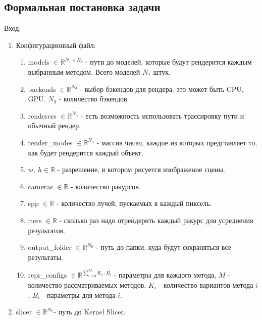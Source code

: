 \documentclass[a4paper,hidelinks,12pt]{article}
\begin{document}
\subsection{Формальная постановка задачи}

Вход:
\par
\begin{enumerate}
	\item Конфигурационный файл:
	\begin{enumerate}
		\item models $\in \mathbb{R}^{N_1 \times N_2}$ - пути до моделей, которые будут рендерится каждым выбранным методом. Всего моделей $N_1$ штук.
		\item backends $\in \mathbb{R}^{N_3}$ - выбор бэкендов для рендера, это может быть CPU, GPU. $N_3$ - количество бэкендов.
		\item renderers $\in \mathbb{R}^{N_4}$ - есть возможность использовать трассировку пути и обычный рендер.
		\item render\_modes $\in \mathbb{R}^{N_5}$ - массив чисел, каждое из которых представляет то, как будет рендерится каждый объект.
		\item $w, \ h \in \mathbb{R}$ - разрешение, в котором рисуется изображение сцены.
		\item cameras $\in \mathbb{R}$ - количество ракурсов.
		\item spp $\in \mathbb{R}$ - количество лучей, пускаемых в каждый пиксель.
		\item iters $\in \mathbb{R}$ - сколько раз надо отрендерить каждый ракурс для усреднения результатов.
		\item output\_folder $\in \mathbb{R}^{N_6}$ - путь до папки, куда будут сохраняться все результаты.
		\item repr\_configs $\in \mathbb{R}^{\sum_{i=0}^{M} K_i \cdot B_i}$ - параметры для каждого метода, $M$ - количество рассматриваемых методов,
		$K_i$ - количество вариантов метода $i$, $B_i$ - параметры для метода $i$.
	\end{enumerate}
	\item slicer $\in \mathbb{R}^{N_7}$- путь до Kernel Slicer.
\end{enumerate}
\end{document}

